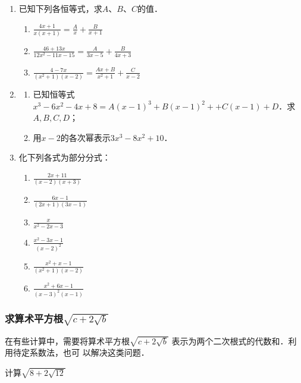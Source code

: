 \begin{ex}
\begin{enumerate}
    \item  已知下列各恒等式，求$A$、$B$、$C$的值．
    \begin{enumerate}
        \item $\frac{4x+1}{x(x+1)}=\frac{A}{x}+\frac{B}{x+1}$
        \item $\frac{46+13x}{12x^2-11x-15}=\frac{A}{3x-5}+\frac{B}{4x+3}$
        \item $\frac{4-7x}{(x^2+1)(x-2)}=\frac{Ax+B}{x^2+1}+\frac{C}{x-2}$
    \end{enumerate}
    \item \begin{enumerate}
        \item 已知恒等式$x^3-6x^2-4x+8=A(x-1)^3+B(x-1)^2+
        +C(x-1)+D$．求$A,B,C,D$；
        \item 用$x-2$的各次幂表示$3x^3-8x^2+10$．
    \end{enumerate}

    \item 化下列各式为部分分式：
    \begin{multicols}{2}
        \begin{enumerate}
    \item $\frac{2x+11}{(x-2)(x+3)}$
    \item $\frac{6x-1}{(2x+1)(3x-1)}$
    \item $\frac{x}{x^2-2x-3}$
    \item $\frac{x^2-3x-1}{(x-2)^2}$
    \item $\frac{x^2+x-1}{(x^2+1)(x-2)}$
    \item $\frac{x^2+6x-1}{(x-3)^2(x-1)}$
\end{enumerate}
    \end{multicols}
\end{enumerate}
    
\end{ex}

\subsubsection{求算术平方根$\sqrt{c+2\sqrt{b}}$}
在有些计算中，需要将算术平方根$\sqrt{c+2\sqrt{b}}$
表示为两个二次根式的代数和．利用待定系数法，也可
以解决这类问题．

\begin{example}
计算$\sqrt{8+2\sqrt{12}}$
\end{example}

